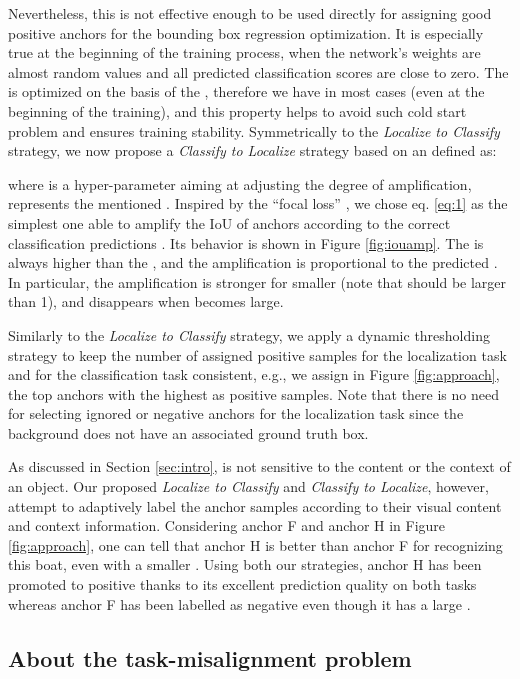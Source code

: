 \documentclass[runningheads]{llncs}
\begin{document}
Nevertheless, this  is not effective enough to be used directly for assigning good positive anchors for the bounding box regression optimization. It is especially true at the beginning of the training process, when the network's weights are almost random values and all predicted classification scores are close to zero. 
The  is optimized on the basis of the , therefore we have  in most cases (even at the beginning of the training), and this property helps to avoid such cold start problem and ensures training stability.
Symmetrically to the \emph{Localize to Classify} strategy, we now propose a \emph{Classify to Localize} strategy based on an  defined as:

where  is a hyper-parameter aiming at adjusting the degree of amplification,  represents the mentioned . Inspired by the “focal loss” \cite{RetinaNet}, we chose eq. \ref{eq:1} as the simplest one  able  to  amplify  the  IoU  of  anchors  according  to  the  correct  classification predictions . Its behavior is shown in Figure \ref{fig:iouamp}. The  is always higher than the , and the amplification is proportional to the predicted . In particular, the amplification is stronger for smaller  (note that  should be larger than 1), and disappears when  becomes large.

Similarly to the \emph{Localize to Classify} strategy, we apply a dynamic thresholding strategy to keep the number of assigned positive samples for the localization task and for the classification task consistent, e.g., we assign in Figure \ref{fig:approach}, the top  anchors with the highest  as positive samples. Note that there is no need for selecting ignored or negative anchors for the localization task since the background does not have an associated ground truth box.

As discussed in Section \ref{sec:intro},  is not sensitive to the content or the context of an object. Our proposed \emph{Localize to Classify} and \emph{Classify to Localize}, however, attempt to adaptively label the anchor samples according to their visual content and context information.
Considering anchor F and anchor H in Figure \ref{fig:approach}, one can tell that anchor H is better than anchor F for recognizing this boat, even with a smaller . Using both our strategies, anchor H has been promoted to positive thanks to its excellent prediction quality on both tasks whereas anchor F has been labelled as negative even though it has a large .

\subsection{About the task-misalignment problem}
\label{sec:align}
\end{document}
